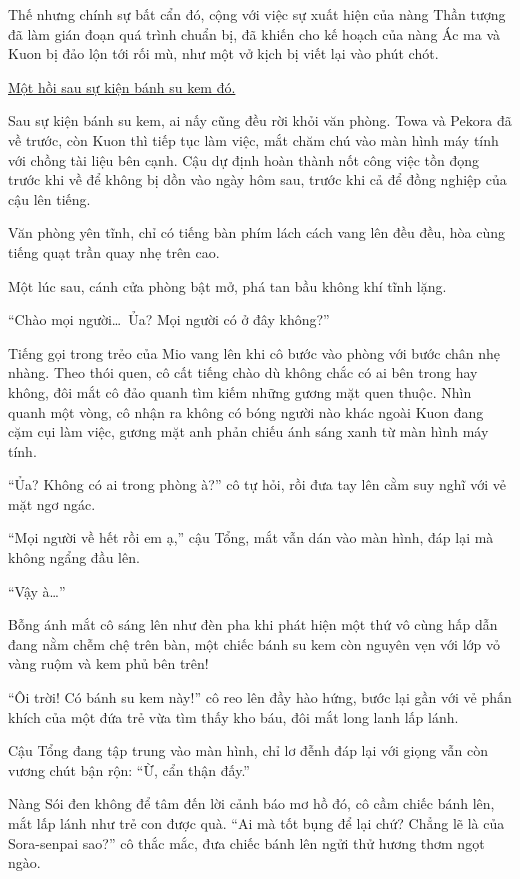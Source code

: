 \documentclass[../main.tex]{subfiles}
\begin{document}
Thế nhưng chính sự bất cẩn đó, cộng với việc sự xuất hiện của nàng Thần tượng đã làm gián đoạn quá trình chuẩn bị, đã khiến cho kế hoạch của nàng Ác ma và Kuon bị đảo lộn tới rối mù, như một vở kịch bị viết lại vào phút chót.

\begin{center}
  \uline{Một hồi sau sự kiện bánh su kem đó.}
\end{center}

Sau sự kiện bánh su kem, ai nấy cũng đều rời khỏi văn phòng. Towa và Pekora đã về trước, còn Kuon thì tiếp tục làm việc, mắt chăm chú vào màn hình máy tính với chồng tài liệu bên cạnh. Cậu dự định hoàn thành nốt công việc tồn đọng trước khi về để không bị dồn vào ngày hôm sau, trước khi cả để đồng nghiệp của cậu lên tiếng.

Văn phòng yên tĩnh, chỉ có tiếng bàn phím lách cách vang lên đều đều, hòa cùng tiếng quạt trần quay nhẹ trên cao.

Một lúc sau, cánh cửa phòng bật mở, phá tan bầu không khí tĩnh lặng.

``Chào mọi người\dots\ Ủa? Mọi người có ở đây không?''

Tiếng gọi trong trẻo của Mio vang lên khi cô bước vào phòng với bước chân nhẹ nhàng. Theo thói quen, cô cất tiếng chào dù không chắc có ai bên trong hay không, đôi mắt cô đảo quanh tìm kiếm những gương mặt quen thuộc. Nhìn quanh một vòng, cô nhận ra không có bóng người nào khác ngoài Kuon đang cặm cụi làm việc, gương mặt anh phản chiếu ánh sáng xanh từ màn hình máy tính.

``Ủa? Không có ai trong phòng à?'' cô tự hỏi, rồi đưa tay lên cằm suy nghĩ với vẻ mặt ngơ ngác.

``Mọi người về hết rồi em ạ,'' cậu Tổng, mắt vẫn dán vào màn hình, đáp lại mà không ngẩng đầu lên.

``Vậy à\dots''

Bỗng ánh mắt cô sáng lên như đèn pha khi phát hiện một thứ vô cùng hấp dẫn đang nằm chễm chệ trên bàn, một chiếc bánh su kem còn nguyên vẹn với lớp vỏ vàng ruộm và kem phủ bên trên!

``Ôi trời! Có bánh su kem này!'' cô reo lên đầy hào hứng, bước lại gần với vẻ phấn khích của một đứa trẻ vừa tìm thấy kho báu, đôi mắt long lanh lấp lánh.

Cậu Tổng đang tập trung vào màn hình, chỉ lơ đễnh đáp lại với giọng vẫn còn vương chút bận rộn: ``Ừ, cẩn thận đấy.''

Nàng Sói đen không để tâm đến lời cảnh báo mơ hồ đó, cô cầm chiếc bánh lên, mắt lấp lánh như trẻ con được quà. ``Ai mà tốt bụng để lại chứ? Chẳng lẽ là của Sora-senpai sao?'' cô thắc mắc, đưa chiếc bánh lên ngửi thử hương thơm ngọt ngào.
\end{document}
